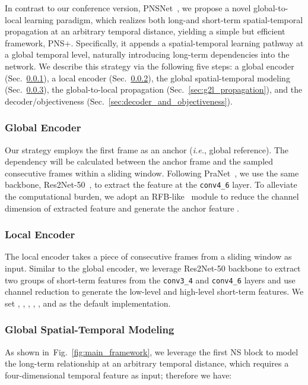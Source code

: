\documentclass[default,iicol]{sn-jnl}
\theoremstyle{thmstyleone}
\theoremstyle{thmstyletwo}
\theoremstyle{thmstylethree}
\newcommand{\figref}[1]{Fig.~\ref{#1}}
\newcommand{\secref}[1]{Sec.~\ref{#1}}
\def\ie{\emph{i.e.}}
\def\ourmodel{PNS+}
\begin{document}
In contrast to our conference version, PNSNet~\cite{ji2021pnsnet}, we propose a novel global-to-local learning paradigm, which realizes both long-and short-term spatial-temporal propagation at an arbitrary temporal distance, yielding a simple but efficient framework, \ourmodel.
Specifically, it appends a spatial-temporal learning pathway at a global temporal level, naturally introducing long-term dependencies into the network.
We describe this strategy via the following five steps: a global encoder (\secref{sec:global_encoder}), a local encoder (\secref{sec:local_encoder}), the global spatial-temporal modeling (\secref{sec:global_ST_modelling}), the global-to-local propagation (\secref{sec:g2l_propagation}), and the decoder/objectiveness (\secref{sec:decoder_and_objectiveness}).

\subsubsection{Global Encoder}\label{sec:global_encoder}
Our strategy employs the first frame  as an anchor (\ie, global reference).
The dependency will be calculated between the anchor frame and the sampled consecutive frames within a sliding window.
Following PraNet~\cite{fan2020pra}, we use the same backbone, Res2Net-50~\cite{pami20Res2net}, to extract the feature at the \texttt{conv4\_6} layer.
To alleviate the computational burden, we adopt an RFB-like~\cite{liu2018receptive} module to reduce the channel dimension of extracted feature and generate the anchor feature .

\subsubsection{Local Encoder}\label{sec:local_encoder}
The local encoder takes a piece of consecutive frames  from a sliding window as input.
Similar to the global encoder, we leverage Res2Net-50 backbone to extract two groups of short-term features from the \texttt{conv3\_4} and \texttt{conv4\_6} layers and use channel reduction to generate the low-level  and high-level  short-term features.
We set , , , , , and  as the default implementation.

\subsubsection{Global Spatial-Temporal Modeling}\label{sec:global_ST_modelling}
As shown in~\figref{fig:main_framework}, we leverage the first NS block to model the long-term relationship at an arbitrary temporal distance, which requires a four-dimensional temporal feature as input; therefore we have: 
\end{document}

